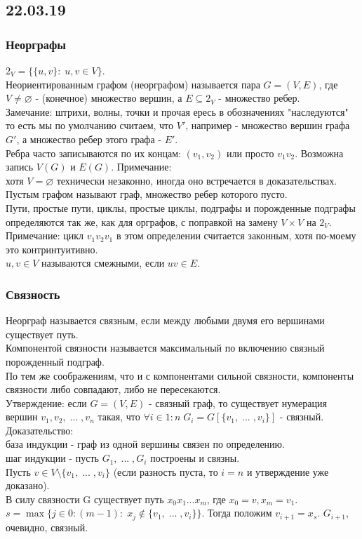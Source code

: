 \subsection{22.03.19}
\subsubsection{Неорграфы}
$2_V = \{\{u, v\}: \; u, v \in V\}$.\\
Неориентированным графом (неорграфом) называется пара $G = (V, E)$, где $V \not= \varnothing$ - (конечное) множество вершин, а $E \subseteq 2_V$ - множество ребер.\\
Замечание: штрихи, волны, точки и прочая ересь в обозначениях "наследуются"\, то есть мы по умолчанию считаем, что $V'$, например - множество вершин графа $G'$, а множество ребер этого графа - $E'$.\\
Ребра часто записываются по их концам: $(v_1, v_2)$ или просто $v_1v_2$.
Возможна запись $V(G)$ и $E(G)$.
Примечание: \\
хотя $V = \varnothing$ технически незаконно, иногда оно встречается в доказательствах.\\
Пустым графом называют граф, множество ребер которого пусто.\\
Пути, простые пути, циклы, простые циклы, подграфы и порожденные подграфы определяются так же, как для орграфов, с поправкой на замену $V \times V$ на $2_V$.\\
Примечание: цикл $v_1v_2v_1$ в этом определении считается законным, хотя по-моему это контринтуитивно.\\
$u, v \in V$ называются смежными, если $uv \in E$.
\subsubsection{Связность}
Неорграф называется связным, если между любыми двумя его вершинами существует путь.\\
Компонентой связности называется максимальный по включению связный порожденный подграф.\\
По тем же соображениям, что и с компонентами сильной связности, компоненты связности либо совпадают, либо не пересекаются.\\
Утверждение: если $G = (V, E)$ - связный граф, то существует нумерация вершин $v_1, v_2, \; ... \; , v_n$ такая, что $\forall i \in 1:n \; G_i = G[\{v_1, \; ... \; , v_i\}]$ - связный.\\
Доказательство:\\
база индукции - граф из одной вершины связен по определению.\\
шаг индукции - пусть $G_1, \; ... \; , G_i$ построены и связны.\\
Пусть $v \in V \setminus \{v_1, \; ... \; , v_i\}$ (если разность пуста, то $i = n$ и утверждение уже доказано).\\
В силу связности G существует путь $x_0x_1...x_m$, где $x_0 = v, x_m = v_1$.\\
$s = \max\{j \in 0:(m - 1) : \; x_j \not\in \{v_1,\;...\;, v_i\}\}$. Тогда положим $v_{i + 1} = x_s$. $G_{i + 1}$, очевидно, связный.\\
